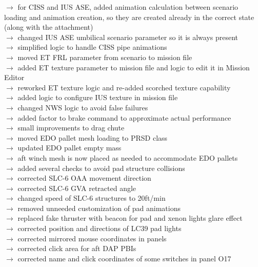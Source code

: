 \documentclass[Space_Shuttle_Vessel_Manual.tex]{subfiles}
\begin{document}
$\rightarrow$ for CISS and IUS ASE, added animation calculation between scenario loading and animation creation, so they are created already in the correct state (along with the attachment)\\
$\rightarrow$ changed IUS ASE umbilical scenario parameter so it is always present\\
$\rightarrow$ simplified logic to handle CISS pipe animations\\
$\rightarrow$ moved ET FRL parameter from scenario to mission file\\
$\rightarrow$ added ET texture parameter to mission file and logic to edit it in Mission Editor\\
$\rightarrow$ reworked ET texture logic and re-added scorched texture capability\\
$\rightarrow$ added logic to configure IUS texture in mission file\\
$\rightarrow$ changed NWS logic to avoid false failures\\
$\rightarrow$ added factor to brake command to approximate actual performance\\
$\rightarrow$ small improvements to drag chute\\
$\rightarrow$ moved EDO pallet mesh loading to PRSD class\\
$\rightarrow$ updated EDO pallet empty mass\\
$\rightarrow$ aft winch mesh is now placed as needed to accommodate EDO pallets\\
$\rightarrow$ added several checks to avoid pad structure collisions\\
$\rightarrow$ corrected SLC-6 OAA movement direction\\
$\rightarrow$ corrected SLC-6 GVA retracted angle\\
$\rightarrow$ changed speed of SLC-6 structures to 20ft/min\\
$\rightarrow$ removed unneeded customization of pad animations\\
$\rightarrow$ replaced fake thruster with beacon for pad and xenon lights glare effect\\
$\rightarrow$ corrected position and directions of LC39 pad lights\\
$\rightarrow$ corrected mirrored mouse coordinates in panels\\
$\rightarrow$ corrected click area for aft DAP PBIs\\
$\rightarrow$ corrected name and click coordinates of some switches in panel O17\\
\end{document}
